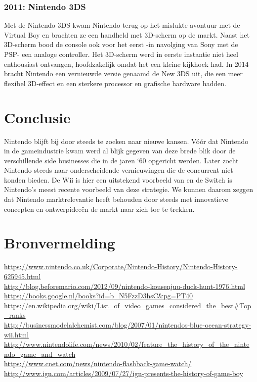 \documentclass{article}
\begin{document}
\subsubsection{2011: Nintendo 3DS}
Met de Nintendo 3DS kwam Nintendo terug op het mislukte avontuur met de Virtual Boy en brachten ze een handheld met 3D-scherm op de markt. Naast het 3D-scherm bood de console ook voor het eerst -in navolging van Sony met de PSP- een analoge controller. Het 3D-scherm werd in eerste instantie niet heel enthousiast ontvangen, hoofdzakelijk omdat het een kleine kijkhoek had. In 2014 bracht Nintendo een vernieuwde versie genaamd de New 3DS uit, die een meer flexibel 3D-effect en een sterkere processor en grafische hardware hadden.

\section{Conclusie}
Nintendo blijft bij door steeds te zoeken naar nieuwe kansen. V\'o\'or dat Nintendo in de gameindustrie kwam werd al blijk gegeven van deze brede blik door de verschillende side businesses die in de jaren `60 opgericht werden. Later zocht Nintendo steeds naar onderscheidende vernieuwingen die de concurrent niet konden bieden. De Wii is hier een uitstekend voorbeeld van en de Switch is Nintendo's meest recente voorbeeld van deze strategie. We kunnen daarom zeggen dat Nintendo marktrelevantie heeft behouden door steeds met innovatieve concepten en ontwerpidee\"en de markt naar zich toe te trekken.
\section{Bronvermelding}
\url{https://www.nintendo.co.uk/Corporate/Nintendo-History/Nintendo-History-625945.html}\\ 
\url{http://blog.beforemario.com/2012/09/nintendo-kousenjuu-duck-hunt-1976.html}\\ 
\url{https://books.google.nl/books?id=b_N5FzzD3hsC&pg=PT40}\\ 
\url{https://en.wikipedia.org/wiki/List_of_video_games_considered_the_best#Top_ranks}\\ 
\url{http://businessmodelalchemist.com/blog/2007/01/nintendos-blue-ocean-strategy-wii.html}\\ 
\url{http://www.nintendolife.com/news/2010/02/feature_the_history_of_the_nintendo_game_and_watch}\\ 
\url{https://www.cnet.com/news/nintendo-flashback-game-watch/}\\ 
\url{http://www.ign.com/articles/2009/07/27/ign-presents-the-history-of-game-boy}\\ 
\end{document}
